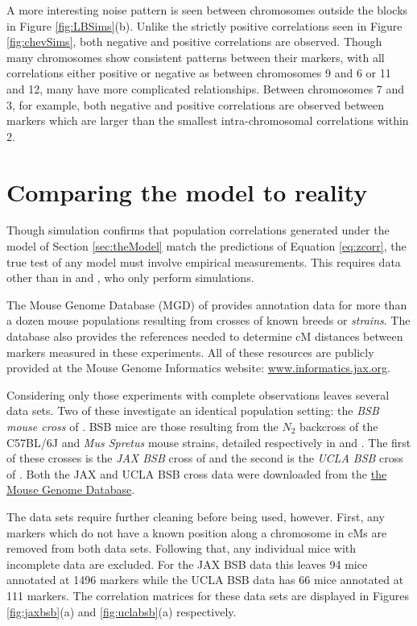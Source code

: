 \documentclass[sts]{imsart}
\begin{document}
A more interesting noise pattern is seen between chromosomes outside the blocks in Figure \ref{fig:LBSims}(b). Unlike the strictly positive correlations seen in Figure \ref{fig:chevSims}, both negative and positive correlations are observed. Though many chromosomes show consistent patterns between their markers, with all correlations either positive or negative as between chromosomes 9 and 6 or 11 and 12, many have more complicated relationships. Between chromosomes 7 and 3, for example, both negative and positive correlations are observed between markers which are larger than the smallest intra-chromosomal correlations within 2.

\section{Comparing the model to reality} \label{sec:model2real}

Though simulation confirms that population correlations generated under the model of Section \ref{sec:theModel} match the predictions of Equation \ref{eq:zcorr}, the true test of any model must involve empirical measurements. This requires data other than in \cite{LanderBotstein1989} and \cite{cheverud2001}, who only perform simulations.

The Mouse Genome Database (MGD) of \cite{bultetal2019mouse} provides annotation data for more than a dozen mouse populations resulting from crosses of known breeds or \emph{strains}. The database also provides the references needed to determine cM distances between markers measured in these experiments. All of these resources are publicly provided at the Mouse Genome Informatics website: \href{www.informatics.jax.org}{www.informatics.jax.org}.

Considering only those experiments with complete observations leaves several data sets. Two of these investigate an identical population setting: the \emph{BSB mouse cross} of \cite{fisleretal1993bsb}. BSB mice are those resulting from the $N_2$ backcross of the C57BL/6J and {\it Mus Spretus} mouse strains, detailed respectively in \cite{C57BL6J} and \cite{dejageretal2009mspretus}. The first of these crosses is the \emph{JAX BSB} cross of \cite{roweetal1994jaxbsb} and the second is the \emph{UCLA BSB} cross of \cite{welchetal1996uclabsb}. Both the JAX and UCLA BSB cross data were downloaded from the \href{www.informatics.jax.org/downloads/reports/index.html}{the Mouse Genome Database}.

The data sets require further cleaning before being used, however. First, any markers which do not have a known position along a chromosome in cMs are removed from both data sets. Following that, any individual mice with incomplete data are excluded. For the JAX BSB data this leaves 94 mice annotated at 1496 markers while the UCLA BSB data has 66 mice annotated at 111 markers. The correlation matrices for these data sets are displayed in Figures \ref{fig:jaxbsb}(a) and \ref{fig:uclabsb}(a) respectively.
\end{document}
